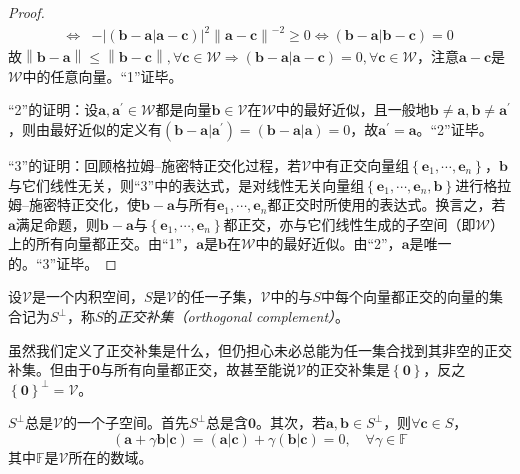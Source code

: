 \documentclass[main.tex]{subfiles}
\begin{document}
\begin{proof}
\begin{align*}
        \Leftrightarrow & -\left|\left(\mathbf{b}-\mathbf{a}|\mathbf{a}-\mathbf{c}\right)\right|^2\left\|\mathbf{a}-\mathbf{c}\right\|^{-2}\geq 0\Leftrightarrow\left(\mathbf{b}-\mathbf{a}|\mathbf{b}-\mathbf{c}\right)=0
    \end{align*}
    故$\left\|\mathbf{b}-\mathbf{a}\right\|\leq\left\|\mathbf{b}-\mathbf{c}\right\|,\forall\mathbf{c}\in\mathcal{W}\Rightarrow\left(\mathbf{b}-\mathbf{a}|\mathbf{a}-\mathbf{c}\right)=0,\forall\mathbf{c}\in\mathcal{W}$，注意$\mathbf{a}-\mathbf{c}$是$\mathcal{W}$中的任意向量。“1”证毕。

    “2”的证明：设$\mathbf{a},\mathbf{a}^\prime\in\mathcal{W}$都是向量$\mathbf{b}\in\mathcal{V}$在$\mathcal{W}$中的最好近似，且一般地$\mathbf{b}\neq\mathbf{a},\mathbf{b}\neq\mathbf{a}^\prime$，则由最好近似的定义有$\left(\mathbf{b}-\mathbf{a}|\mathbf{a}^\prime\right)=\left(\mathbf{b}-\mathbf{a}|\mathbf{a}\right)=0$，故$\mathbf{a}^\prime=\mathbf{a}$。“2”证毕。

    “3”的证明：回顾格拉姆--施密特正交化过程，若$\mathcal{V}$中有正交向量组$\left\{\mathbf{e}_1,\cdots,\mathbf{e}_n\right\}$，$\mathbf{b}$与它们线性无关，则“3”中的表达式，是对线性无关向量组$\left\{\mathbf{e}_1,\cdots,\mathbf{e}_n,\mathbf{b}\right\}$进行格拉姆--施密特正交化，使$\mathbf{b}-\mathbf{a}$与所有$\mathbf{e}_1,\cdots,\mathbf{e}_n$都正交时所使用的表达式。换言之，若$\mathbf{a}$满足命题，则$\mathbf{b}-\mathbf{a}$与$\left\{\mathbf{e}_1,\cdots,\mathbf{e}_n\right\}$都正交，亦与它们线性生成的子空间（即$\mathcal{W}$）上的所有向量都正交。由“1”，$\mathbf{a}$是$\mathbf{b}$在$\mathcal{W}$中的最好近似。由“2”，$\mathbf{a}$是唯一的。“3”证毕。
\end{proof}

\begin{definition}[正交补集]\label{def:A.5}
    设$\mathcal{V}$是一个内积空间，$S$是$\mathcal{V}$的任一子集，$\mathcal{V}$中的与$S$中每个向量都正交的向量的集合记为$S^\perp$，称$S$的\emph{正交补集（orthogonal complement）}。
\end{definition}

虽然我们定义了正交补集是什么，但仍担心未必总能为任一集合找到其非空的正交补集。但由于$\mathbf{0}$与所有向量都正交，故甚至能说$\mathcal{V}$的正交补集是$\left\{\mathbf{0}\right\}$，反之$\left\{\mathbf{0}\right\}^\perp=\mathcal{V}$。

$S^\perp$总是$\mathcal{V}$的一个子空间。首先$S^\perp$总是含$\mathbf{0}$。其次，若$\mathbf{a},\mathbf{b}\in S^\perp$，则$\forall\mathbf{c}\in S$，
\[\left(\mathbf{a}+\gamma\mathbf{b}|\mathbf{c}\right)=\left(\mathbf{a}|\mathbf{c}\right)+\gamma\left(\mathbf{b}|\mathbf{c}\right)=0,\quad\forall\gamma\in\mathbb{F}\]
其中$\mathbb{F}$是$\mathcal{V}$所在的数域。
\end{document}
